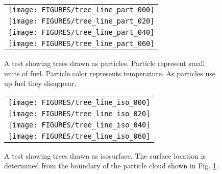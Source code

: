 \begin{figure}[\figoptions]
\begin{center}
\begin{tabular}{c}
 \texttt{[image: FIGURES/tree\_line\_part\_000]}\\
 \texttt{[image: FIGURES/tree\_line\_part\_020]}\\
 \texttt{[image: FIGURES/tree\_line\_part\_040]}\\
 \texttt{[image: FIGURES/tree\_line\_part\_060]}
 \end{tabular}
\end{center}
 \caption[A test showing trees drawn as particles.]{A test showing trees drawn as particles.  Particle represent small units of fuel.
 Particle color represents temperature.  As particles use up fuel they disappear.}
\label{figWUIparts}%
\end{figure}

\begin{figure}[\figoptions]
\begin{center}
\begin{tabular}{c}
 \texttt{[image: FIGURES/tree\_line\_iso\_000]}\\
 \texttt{[image: FIGURES/tree\_line\_iso\_020]}\\
 \texttt{[image: FIGURES/tree\_line\_iso\_040]}\\
 \texttt{[image: FIGURES/tree\_line\_iso\_060]}
 \end{tabular}
\end{center}
 \caption[A test showing trees drawn as isosurfaces.]{A test showing trees drawn as isosurface.  The surface location
 is determined from the boundary of the  particle cloud shown in Fig. \ref{figWUIparts}.}
\label{figWUIiso}%
\end{figure}
\npage
